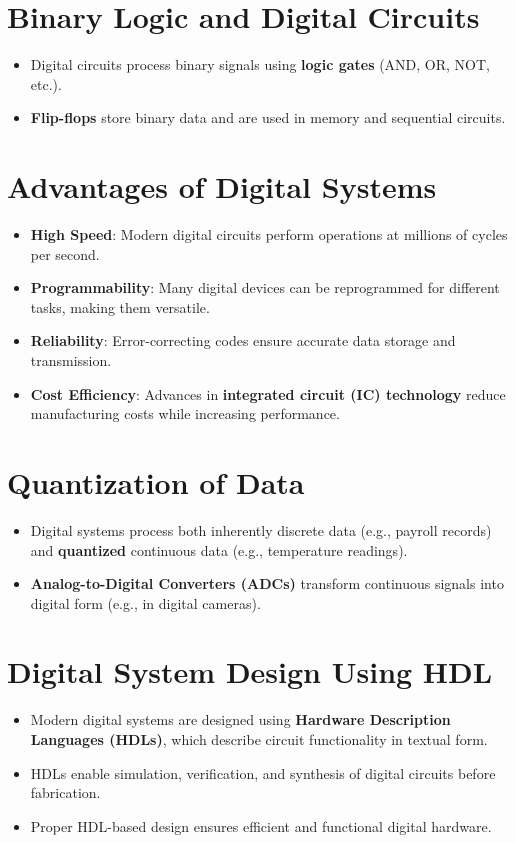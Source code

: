 \documentclass{article}
\begin{document}
\section{Binary Logic and Digital Circuits}
\begin{itemize}
    \item Digital circuits process binary signals using \textbf{logic gates} (AND, OR, NOT, etc.).
    \item \textbf{Flip-flops} store binary data and are used in memory and sequential circuits.
\end{itemize}

\section{Advantages of Digital Systems}
\begin{itemize}
    \item \textbf{High Speed}: Modern digital circuits perform operations at millions of cycles per second.
    \item \textbf{Programmability}: Many digital devices can be reprogrammed for different tasks, making them versatile.
    \item \textbf{Reliability}: Error-correcting codes ensure accurate data storage and transmission.
    \item \textbf{Cost Efficiency}: Advances in \textbf{integrated circuit (IC) technology} reduce manufacturing costs while increasing performance.
\end{itemize}

\section{Quantization of Data}
\begin{itemize}
    \item Digital systems process both inherently discrete data (e.g., payroll records) and \textbf{quantized} continuous data (e.g., temperature readings).
    \item \textbf{Analog-to-Digital Converters (ADCs)} transform continuous signals into digital form (e.g., in digital cameras).
\end{itemize}

\section{Digital System Design Using HDL}
\begin{itemize}
    \item Modern digital systems are designed using \textbf{Hardware Description Languages (HDLs)}, which describe circuit functionality in textual form.
    \item HDLs enable simulation, verification, and synthesis of digital circuits before fabrication.
    \item Proper HDL-based design ensures efficient and functional digital hardware.
\end{itemize}
\end{document}
